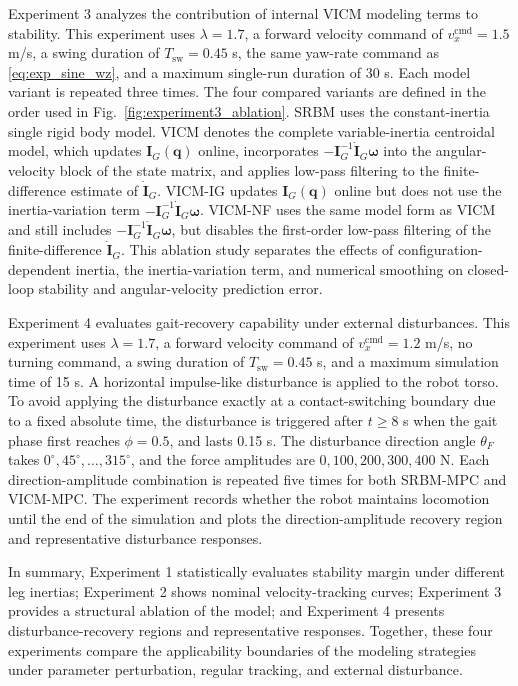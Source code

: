 \documentclass[5p,times]{elsarticle}
\begin{document}
Experiment 3 analyzes the contribution of internal VICM modeling terms to stability. This experiment uses $\lambda=1.7$, a forward velocity command of $v_x^{\mathrm{cmd}}=1.5$ m/s, a swing duration of $T_{\mathrm{sw}}=0.45$ s, the same yaw-rate command as \eqref{eq:exp_sine_wz}, and a maximum single-run duration of 30 s. Each model variant is repeated three times. The four compared variants are defined in the order used in Fig.~\ref{fig:experiment3_ablation}. SRBM uses the constant-inertia single rigid body model. VICM denotes the complete variable-inertia centroidal model, which updates $\bm I_G(\bm q)$ online, incorporates $-\bm I_G^{-1}\dot{\bm I}_G\bm\omega$ into the angular-velocity block of the state matrix, and applies low-pass filtering to the finite-difference estimate of $\dot{\bm I}_G$. VICM-IG updates $\bm I_G(\bm q)$ online but does not use the inertia-variation term $-\bm I_G^{-1}\dot{\bm I}_G\bm\omega$. VICM-NF uses the same model form as VICM and still includes $-\bm I_G^{-1}\dot{\bm I}_G\bm\omega$, but disables the first-order low-pass filtering of the finite-difference $\dot{\bm I}_G$. This ablation study separates the effects of configuration-dependent inertia, the inertia-variation term, and numerical smoothing on closed-loop stability and angular-velocity prediction error.

Experiment 4 evaluates gait-recovery capability under external disturbances. This experiment uses $\lambda=1.7$, a forward velocity command of $v_x^{\mathrm{cmd}}=1.2$ m/s, no turning command, a swing duration of $T_{\mathrm{sw}}=0.45$ s, and a maximum simulation time of 15 s. A horizontal impulse-like disturbance is applied to the robot torso. To avoid applying the disturbance exactly at a contact-switching boundary due to a fixed absolute time, the disturbance is triggered after $t\ge8$ s when the gait phase first reaches $\phi=0.5$, and lasts 0.15 s. The disturbance direction angle $\theta_F$ takes $0^\circ,45^\circ,\ldots,315^\circ$, and the force amplitudes are $0,100,200,300,400$ N. Each direction-amplitude combination is repeated five times for both SRBM-MPC and VICM-MPC. The experiment records whether the robot maintains locomotion until the end of the simulation and plots the direction-amplitude recovery region and representative disturbance responses.

In summary, Experiment 1 statistically evaluates stability margin under different leg inertias; Experiment 2 shows nominal velocity-tracking curves; Experiment 3 provides a structural ablation of the model; and Experiment 4 presents disturbance-recovery regions and representative responses. Together, these four experiments compare the applicability boundaries of the modeling strategies under parameter perturbation, regular tracking, and external disturbance.
\end{document}
